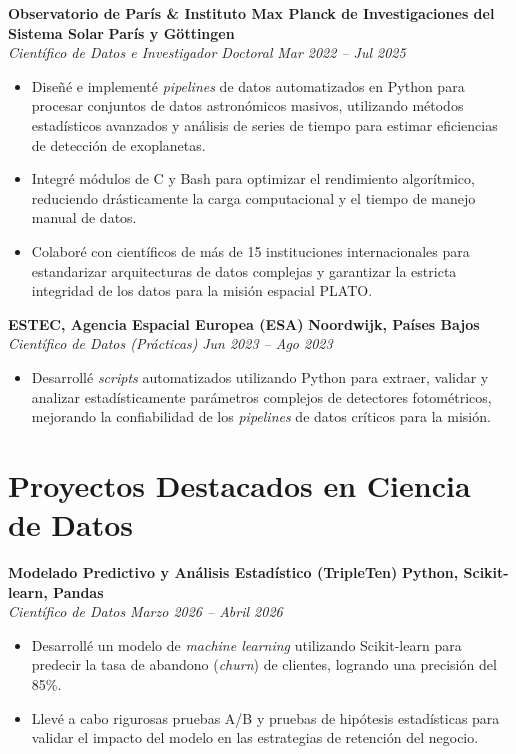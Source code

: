 \documentclass[10pt,a4paper]{article}
\begin{document}
\textbf{Observatorio de París \& Instituto Max Planck de Investigaciones del Sistema Solar} \hfill \textbf{París y Göttingen} \\
\textit{Científico de Datos e Investigador Doctoral} \hfill \textit{Mar 2022 -- Jul 2025}
\begin{itemize}[leftmargin=1.5em]
    \item Diseñé e implementé \textit{pipelines} de datos automatizados en Python para procesar conjuntos de datos astronómicos masivos, utilizando métodos estadísticos avanzados y análisis de series de tiempo para estimar eficiencias de detección de exoplanetas.
    \item Integré módulos de C y Bash para optimizar el rendimiento algorítmico, reduciendo drásticamente la carga computacional y el tiempo de manejo manual de datos.
    \item Colaboré con científicos de más de 15 instituciones internacionales para estandarizar arquitecturas de datos complejas y garantizar la estricta integridad de los datos para la misión espacial PLATO.
\end{itemize}

\textbf{ESTEC, Agencia Espacial Europea (ESA)} \hfill \textbf{Noordwijk, Países Bajos}\\
\textit{Científico de Datos (Prácticas)}  \hfill \textit{Jun 2023 -- Ago 2023}
\begin{itemize}[leftmargin=1.5em]
    \item Desarrollé \textit{scripts} automatizados utilizando Python para extraer, validar y analizar estadísticamente parámetros complejos de detectores fotométricos, mejorando la confiabilidad de los \textit{pipelines} de datos críticos para la misión.
\end{itemize}

\section*{Proyectos Destacados en Ciencia de Datos}
\textbf{Modelado Predictivo y Análisis Estadístico (TripleTen)} \hfill \textbf{Python, Scikit-learn, Pandas} \\
\textit{Científico de Datos} \hfill \textit{Marzo 2026 -- Abril 2026}
\begin{itemize}[leftmargin=1.5em]
    \item Desarrollé un modelo de \textit{machine learning} utilizando Scikit-learn para predecir la tasa de abandono (\textit{churn}) de clientes, logrando una precisión del 85\%.
    \item Llevé a cabo rigurosas pruebas A/B y pruebas de hipótesis estadísticas para validar el impacto del modelo en las estrategias de retención del negocio.
\end{itemize}
\end{document}
